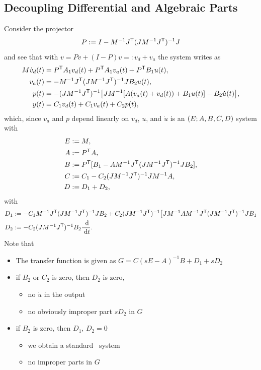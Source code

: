 \subsection{Decoupling Differential and Algebraic Parts}
Consider the projector
\begin{equation*}
	P := I - M^{-1}J^{\mathsf{T}}(JM^{-1}J^{\mathsf{T}})^{-1}J
\end{equation*}
and see that with $v=Pv + (I-P)v=:v_d + v_a$ the system writes as
	\begin{align*}
		M \dot v_d(t) &=  P^{\mathsf{T}} A_1v_d (t) + P^{\mathsf{T}} A_1v_a(t)+  P^{\mathsf{T}} B_1 u(t), \\
		v_a(t) &= -M^{-1}J^{\mathsf{T}}(JM^{-1}J^{\mathsf{T}})^{-1}JB_2u(t), \\
		p(t) &= -(JM^{-1}J^{\mathsf{T}})^{-1}\bigl[ JM^{-1}[A(v_a(t)+v_d(t))+B_1u(t)]-B_2\dot u(t)\bigr], \\
		y(t) &= C_1v_d(t)+C_1v_a(t) + C_2p(t),
	\end{align*}
which, since $v_a$ and $p$ depend linearly on $v_d$, $u$, and $\dot u$ is an $(E;A,B,C,D)$ system with
\begin{align*}
	E &:= M, \\
	A &:= P^{\mathsf{T}} A, \\
	B &:= P^{\mathsf{T}} [B_1 - AM^{-1}J^{\mathsf{T}}(JM^{-1}J^{\mathsf{T}})^{-1}JB_2], \\
	C &:= C_1 - C_2(JM^{-1}J^{\mathsf{T}})^{-1}JM^{-1}A, \\
	D &:= D_1 + D_2,
\end{align*}
with
\begin{align*}
	D_1&:=-C_1M^{-1}J^{\mathsf{T}}(JM^{-1}J^{\mathsf{T}})^{-1}JB_2 + C_2(JM^{-1}J^{\mathsf{T}})^{-1}\bigl[ JM^{-1}AM^{-1}J^{\mathsf{T}}(JM^{-1}J^{\mathsf{T}})^{-1}JB_1 \\
	D_2&:=-C_2(JM^{-1}J^{\mathsf{T}})^{-1}B_2\frac{\text{~\textup{d}}}{\text{~\textup{d}} t}.
\end{align*}
Note that 
\begin{itemize}
	\item The transfer function is given as $G=C(sE-A)^{-1}B+D_1+sD_2$
	\item if $B_2$ or $C_2$ is zero, then $D_2$ is zero,
		\begin{itemize}
			\item no $\dot u$ in the output
			\item no obviously improper part $sD_2$ in $G$
		\end{itemize}
	\item if $B_2$ is zero, then $D_1$, $D_2=0$
		\begin{itemize}
			\item we obtain a standard \eabcsys~system
			\item no improper parts in $G$
		\end{itemize}
\end{itemize}

